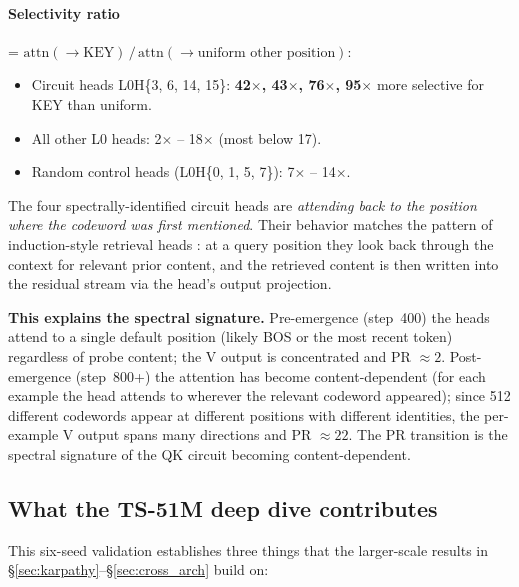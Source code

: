 \documentclass[11pt]{article}
\begin{document}
\paragraph{Selectivity ratio} = $\mathrm{attn}(\to\!\text{KEY}) \,/\, \mathrm{attn}(\to\!\text{uniform other position})$:

\begin{itemize}[leftmargin=*,topsep=2pt,itemsep=2pt]
\item Circuit heads L0H\{3, 6, 14, 15\}: \textbf{42$\times$, 43$\times$, 76$\times$, 95$\times$} more selective for KEY than uniform.
\item All other L0 heads: 2$\times$ -- 18$\times$ (most below 17).
\item Random control heads (L0H\{0, 1, 5, 7\}): 7$\times$ -- 14$\times$.
\end{itemize}

The four spectrally-identified circuit heads are \emph{attending back to the position where the codeword was first mentioned}. Their behavior matches the pattern of induction-style retrieval heads \citep{olsson2022induction}: at a query position they look back through the context for relevant prior content, and the retrieved content is then written into the residual stream via the head's output projection.

\textbf{This explains the spectral signature.} Pre-emergence (step~400) the heads attend to a single default position (likely BOS or the most recent token) regardless of probe content; the V output is concentrated and PR $\approx 2$. Post-emergence (step~800+) the attention has become content-dependent (for each example the head attends to wherever the relevant codeword appeared); since 512 different codewords appear at different positions with different identities, the per-example V output spans many directions and PR $\approx 22$. The PR transition is the spectral signature of the QK circuit becoming content-dependent.

\subsection{What the TS-51M deep dive contributes}

This six-seed validation establishes three things that the larger-scale results in \S\ref{sec:karpathy}--\S\ref{sec:cross_arch} build on:
\end{document}
